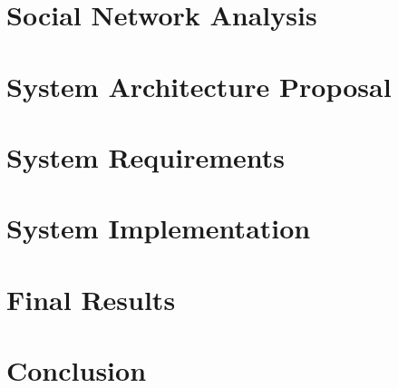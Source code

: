 \documentclass[
  oneside,
  11pt, a4paper,
  footinclude=true,
  headinclude=true,
  cleardoublepage=empty
]{scrbook}
\begin{document}
	\chapter{Social Network Analysis}
	

	\chapter{System Architecture Proposal}
	

	\chapter{System Requirements}
	

	\chapter{System Implementation}
	

	\chapter{Final Results}
	

	\chapter{Conclusion}
	

	\cleardoublepage

	
\end{document}
